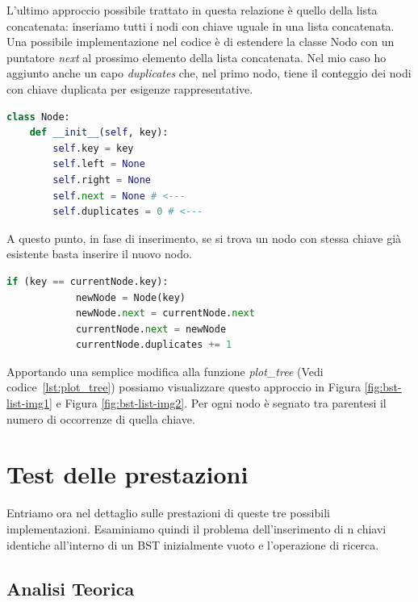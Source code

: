 \documentclass{article}
\begin{document}
L'ultimo approccio possibile trattato in questa relazione è quello  della lista concatenata: inseriamo tutti i nodi con chiave uguale in una lista concatenata.
Una possibile implementazione nel codice è di estendere la classe Nodo con un puntatore \textit{next} al prossimo elemento della lista concatenata. Nel mio caso ho aggiunto anche un capo   \textit{duplicates} che, nel primo nodo, tiene il conteggio dei nodi con chiave duplicata per esigenze rappresentative.

\begin{lstlisting}[language=Python, caption={Classe Nodo di un BST con lista concatenata}]
class Node:
    def __init__(self, key):
        self.key = key
        self.left = None
        self.right = None
        self.next = None # <---
        self.duplicates = 0 # <---
\end{lstlisting}

A questo punto, in fase di inserimento, se si trova un nodo con stessa chiave già esistente basta inserire il nuovo nodo.

\begin{lstlisting}[language=Python, caption={Gestione chiavi duplicate con lista concatenata}]
     if (key == currentNode.key):
            newNode = Node(key)
            newNode.next = currentNode.next
            currentNode.next = newNode
            currentNode.duplicates += 1

\end{lstlisting}

\vspace{20px}

Apportando una semplice modifica alla funzione \textit{plot\_tree} (Vedi codice~\ref{lst:plot_tree}) possiamo visualizzare questo approccio in Figura \ref{fig:bst-list-img1} e Figura \ref{fig:bst-list-img2}.
Per ogni nodo è segnato tra parentesi il numero di occorrenze di quella chiave.



\section{Test delle prestazioni}
Entriamo ora nel dettaglio sulle prestazioni di queste tre possibili implementazioni.
Esaminiamo quindi il problema dell'inserimento di n chiavi identiche all'interno di un BST inizialmente vuoto e l'operazione di ricerca. 

\subsection{Analisi Teorica}
\end{document}

